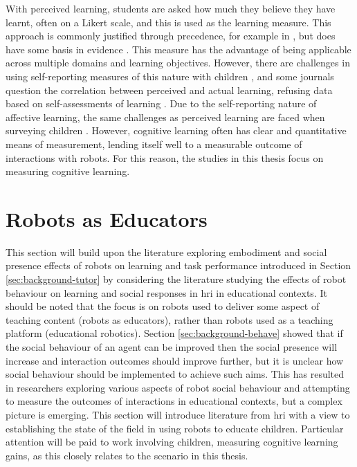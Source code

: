 With perceived learning, students are asked how much they believe they have learnt, often on a Likert scale, and this is used as the learning measure. This approach is commonly justified through precedence, for example in \cite{butland1992teacher}, but does have some basis in evidence \citep{perry2007scholarship}. This measure has the advantage of being applicable across multiple domains and learning objectives. However, there are challenges in using self-reporting measures of this nature with children \citep{borgers2000children}, and some journals question the correlation between perceived and actual learning, refusing data based on self-assessments of learning \citep{dipiro2010student}. Due to the self-reporting nature of affective learning, the same challenges as perceived learning are faced when surveying children \citep{borgers2000children}. However, cognitive learning often has clear and quantitative means of measurement, lending itself well to a measurable outcome of interactions with robots. For this reason, the studies in this thesis focus on measuring cognitive learning.

\section{Robots as Educators}\label{sec:background-robottutors}
This section will build upon the literature exploring embodiment and social presence effects of robots on learning and task performance introduced in Section \ref{sec:background-tutor} by considering the literature studying the effects of robot behaviour on learning and social responses in \acrshort{hri} in educational contexts. It should be noted that the focus is on robots used to deliver some aspect of teaching content (robots as educators), rather than robots used as a teaching platform (educational robotics). Section \ref{sec:background-behave} showed that if the social behaviour of an agent can be improved then the social presence will increase and interaction outcomes should improve further, but it is unclear how social behaviour should be implemented to achieve such aims. This has resulted in researchers exploring various aspects of robot social behaviour and attempting to measure the outcomes of interactions in educational contexts, but a complex picture is emerging. This section will introduce literature from \acrshort{hri} with a view to establishing the state of the field in using robots to educate children. Particular attention will be paid to work involving children, measuring cognitive learning gains, as this closely relates to the scenario in this thesis.

